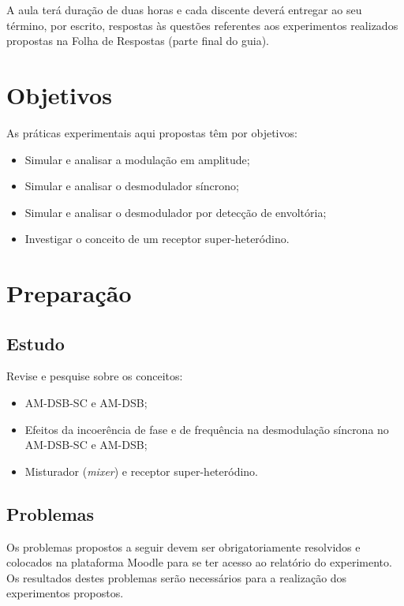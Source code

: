 \documentclass[12pt,addpoints]{exam}
\begin{document}
A aula terá duração de duas horas e cada discente deverá entregar ao seu término, por escrito, respostas às questões referentes aos experimentos realizados propostas na Folha de Respostas (parte final do guia).

\section{Objetivos}

As práticas experimentais aqui propostas têm por objetivos:
\begin{itemize}
    \item Simular e analisar a modulação em amplitude;
    \item Simular e analisar o desmodulador síncrono;
    \item Simular e analisar o desmodulador por detecção de envoltória;
    \item Investigar o conceito de um receptor super-heteródino.
\end{itemize}

\section{Preparação} \label{sect:Preparacao}

\subsection{Estudo}

Revise e pesquise sobre os conceitos:
\begin{itemize}
    \item AM-DSB-SC e AM-DSB;
    \item Efeitos da incoerência de fase e de frequência na desmodulação síncrona no AM-DSB-SC e AM-DSB;
    \item Misturador (\textit{mixer}) e receptor super-heteródino.
\end{itemize}

\subsection{Problemas}

Os problemas propostos a seguir devem ser obrigatoriamente resolvidos e colocados na plataforma Moodle para se ter acesso ao relatório do experimento. %
Os resultados destes problemas serão necessários para a realização dos experimentos propostos. 
\end{document}
